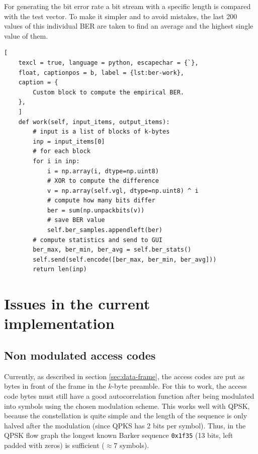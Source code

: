 For generating the bit error rate a bit stream with a specific length is compared with the test vector. To make it simpler and to avoid mistakes, the last 200 values of this individual BER are taken to find an average and the highest single value of them. 



\begin{lstlisting}[
	texcl = true, language = python, escapechar = {`},
	float, captionpos = b, label = {lst:ber-work},
	caption = {
		Custom block to compute the empirical BER.
	},
	]
	def work(self, input_items, output_items):
		# input is a list of blocks of k-bytes
		inp = input_items[0]
		# for each block
		for i in inp:
			i = np.array(i, dtype=np.uint8)
			# XOR to compute the difference
			v = np.array(self.vgl, dtype=np.uint8) ^ i
			# compute how many bits differ
			ber = sum(np.unpackbits(v))
			# save BER value
			self.ber_samples.appendleft(ber)
		# compute statistics and send to GUI
		ber_max, ber_min, ber_avg = self.ber_stats()
		self.send(self.encode([ber_max, ber_min, ber_avg]))
		return len(inp)
\end{lstlisting}

\section{Issues in the current implementation}

\subsection{Non modulated access codes} \label{sec:access-code-issue}

Currently, as described in section \ref{sec:data-frame}, the access codes are put as bytes in front of the frame in the \(k\)-byte preamble. For this to work, the access code bytes must still have a good autocorrelation function after being modulated into symbols using the chosen modulation scheme. This works well with QPSK, because the constellation is quite simple and the length of the sequence is only halved after the modulation (since QPKS has 2 bits per symbol). Thus, in the QPSK flow graph the longest known Barker sequence  \texttt{0x1f35} (13 bits, left padded with zeros) is sufficient (\(\approx 7\) symbols).

